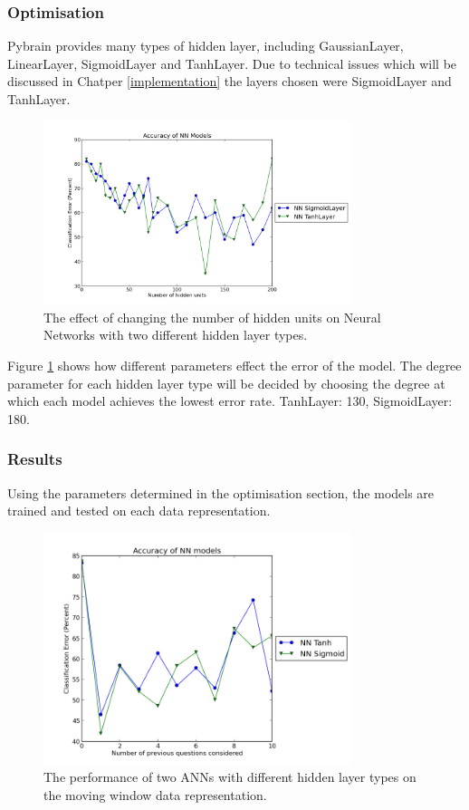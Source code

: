 \subsubsection{Optimisation}
Pybrain provides many types of hidden layer, including GaussianLayer, LinearLayer, SigmoidLayer and TanhLayer. Due to technical issues which will be discussed in Chatper \ref{implementation} the layers chosen were SigmoidLayer and TanhLayer.

\begin{figure}[h!]
\centering
\includegraphics[width=0.8\textwidth]{images/nnall200.png}
\caption{The effect of changing the number of hidden units on Neural Networks with two different hidden layer types.}
\label{fig:nnall200}
\end{figure}

Figure \ref{fig:nnall200} shows how different parameters effect the error of the model. The degree parameter for each hidden layer type will be decided by choosing the degree at which each model achieves the lowest error rate. TanhLayer: 130, SigmoidLayer: 180.

\subsubsection{Results}
Using the parameters determined in the optimisation section, the models are trained and tested on each data representation.

\begin{figure}[h!]
\centering
\includegraphics[width=0.8\textwidth]{images/nnmovingwindow.png}
\caption{The performance of two ANNs with different hidden layer types on the moving window data representation.}
\label{fig:nnmovingwindow}
\end{figure}

